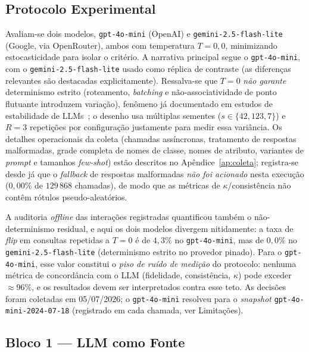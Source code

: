 \documentclass[12pt,a4paper]{article}
\begin{document}
\subsection{Protocolo Experimental}

Avaliam-se dois modelos, \texttt{gpt-4o-mini} (OpenAI) e \texttt{gemini-2.5-flash-lite}
(Google, via OpenRouter), ambos com temperatura $T = 0{,}0$, minimizando estocasticidade
para isolar o critério. A narrativa principal segue o \texttt{gpt-4o-mini}, com o
\texttt{gemini-2.5-flash-lite} usado como réplica de contraste (as diferenças relevantes
são destacadas explicitamente). Ressalva-se que $T=0$ \emph{não garante} determinismo
estrito (roteamento, \emph{batching} e não-associatividade de ponto flutuante introduzem
variação), fenômeno já documentado em estudos de estabilidade de
LLMs~\cite{atilLLMStability2024, windischOneRun2026}; o desenho usa múltiplas sementes
($s \in \{42, 123, 7\}$) e $R = 3$ repetições por configuração justamente para medir essa
variância. Os detalhes operacionais da coleta (chamadas assíncronas, tratamento de
respostas malformadas, grade completa de nomes de classe, nomes de atributo, variantes de
\emph{prompt} e tamanhos \emph{few-shot}) estão descritos no Apêndice~\ref{ap:coleta};
registra-se desde já que o \emph{fallback} de respostas malformadas \emph{não foi
acionado} nesta execução ($0{,}00\%$ de $129\,868$ chamadas), de modo que as métricas de
$\kappa$/consistência não contêm rótulos pseudo-aleatórios.

A auditoria \emph{offline} das interações registradas quantificou também o não-determinismo
residual, e aqui os dois modelos divergem nitidamente: a taxa de \emph{flip} em consultas
repetidas a $T=0$ é de $4{,}3\%$ no \texttt{gpt-4o-mini}, mas de $0{,}0\%$ no
\texttt{gemini-2.5-flash-lite} (determinismo estrito no provedor pinado). Para o
\texttt{gpt-4o-mini}, esse valor constitui o \emph{piso de ruído de medição} do protocolo:
nenhuma métrica de concordância com o LLM (fidelidade, consistência, $\kappa$) pode exceder
$\approx 96\%$, e os resultados devem ser interpretados contra esse teto. As decisões foram
coletadas em 05/07/2026; o \texttt{gpt-4o-mini} resolveu para o \emph{snapshot}
\texttt{gpt-4o-mini-2024-07-18} (registrado em cada chamada, ver Limitações).

\subsection{Bloco 1 — LLM como Fonte}
\end{document}
